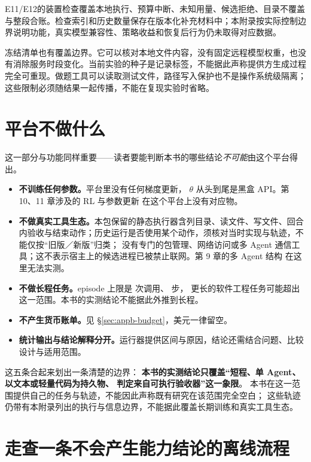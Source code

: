 E11/E12的装置检查覆盖本地执行、预算中断、未知用量、候选拒绝、目录不覆盖与整段合账。检查索引和历史数量保存在版本化补充材料中；本附录按实际控制边界说明功能，真实模型兼容性、策略收益和恢复后行为仍未取得对应数据。

冻结清单也有覆盖边界。它可以核对本地文件内容，没有固定远程模型权重，也没有消除服务时段变化。当前实验的种子是记录标签，不能据此声称提供方生成过程完全可重现。做题工具可以读取测试文件，路径写入保护也不是操作系统级隔离；这些限制必须随结果一起传播，不能在复现实验时省略。

\section{平台不做什么}
\label{sec:appb-limits}

这一部分与功能同样重要——读者要能判断本书的哪些结论\emph{不可能}由这个平台得出。

\begin{itemize}
  \item \textbf{不训练任何参数。}平台里没有任何梯度更新，
        $\theta$ 从头到尾是黑盒 API。第 10、11 章涉及的 RL 与参数更新
        在这个平台上没有对应物。
  \item \textbf{不做真实工具生态。}本包保留的静态执行器含列目录、读文件、写文件、回合内验收与结束动作；历史运行是否使用某个动作，须核对当时实现与轨迹，不能仅按“旧版／新版”归类；
        没有专门的包管理、网络访问或多 Agent 通信工具；这不表示宿主上的候选进程已被禁止联网。第 9 章的多 Agent 结构
        在这里无法实测。
  \item \textbf{不做长程任务。}episode 上限是  次调用、 步，
        更长的软件工程任务可能超出这一范围。本书的实测结论不能据此外推到长程。
  \item \textbf{不产生货币账单。}见 §\ref{sec:appb-budget}，美元一律留空。
  \item \textbf{统计输出与结论解释分开。}运行器提供区间与原因，结论还需结合问题、比较设计与适用范围。
\end{itemize}

\begin{sloppypar}
这五条合起来划出一条清楚的边界：
\textbf{本书的实测结论只覆盖``短程、单 Agent、以文本或轻量代码为持久物、
判定来自可执行验收器''这一象限}。
本书在这一范围提供自己的任务与轨迹，不能因此声称既有研究在该范围完全空白；
这些轨迹仍带有本附录列出的执行与信息边界，不能据此覆盖长期训练和真实工具生态。
\end{sloppypar}

\section{走查一条不会产生能力结论的离线流程}
\label{sec:appb-e01-offline}

